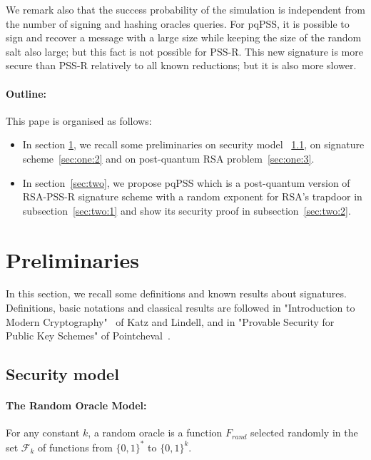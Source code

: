 \documentclass[a4paper,11pt]{article}
\begin{document}
We remark also that the success  probability of the simulation is independent from the number of signing and hashing oracles queries. For pqPSS, it is possible to sign and recover a message with a large size while keeping the size of the random salt also large; but this fact is not possible for PSS-R. This new signature is more secure than PSS-R relatively to all known reductions; but it is also more slower.

\paragraph{Outline:} This pape is organised as follows:
\begin{itemize}
\item In section \ref{sect:2}, we recall some preliminaries on security model ~\ref{sec:one:1}, on signature scheme~\ref{sec:one:2} and on post-quantum RSA problem~\ref{sec:one:3}.
\item In section~\ref{sec:two}, we propose pqPSS which is a post-quantum version of RSA-PSS-R signature scheme with a random exponent for RSA's trapdoor in subsection~\ref{sec:two:1} and show its security proof in subsection~\ref{sec:two:2}.
\end{itemize}


\section{Preliminaries}\label{sect:2}
In this section, we recall some definitions and known results about signatures.
Definitions, basic notations and classical results are followed in "Introduction to Modern Cryptography"~\cite{Katz}
of Katz and Lindell, and  in "Provable Security for Public Key Schemes" of Pointcheval~\cite{Pointcheval}.

\subsection{Security model}\label{sec:one:1}

\paragraph{The Random Oracle Model:}

For any constant $k$, a random oracle is a function $F_{rand}$ selected randomly in the set $\mathcal{F}_{k}$ of functions from $\{0,1\}^{*}$ to $\{0,1\}^{k}$.
\end{document}
